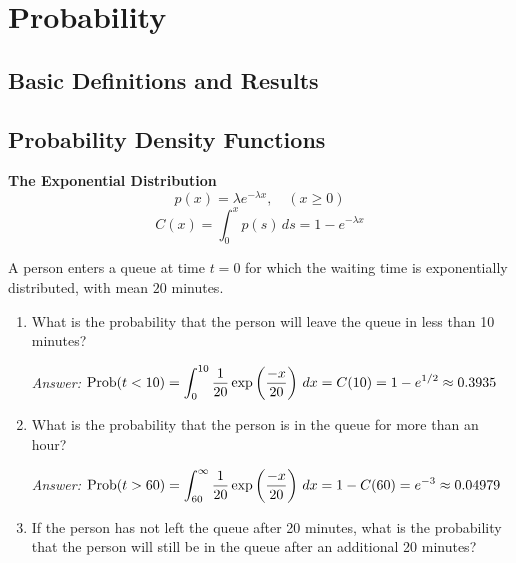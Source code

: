 %
\chapter{Probability}
%
\section{Basic Definitions and Results}
%
\section{Probability Density Functions}
%

\noindent
\textbf{The Exponential Distribution}
\begin{equation}
 p(x) = \lambda e^{-\lambda x}, \quad (x \ge 0)
\end{equation}
\begin{equation}
  C(x) = \int_0^x p(s)\,ds =  1 - e^{-\lambda x}
\end{equation}
\begin{xexample}
A person enters a queue at time $t=0$ for which the
waiting time is exponentially distributed, with mean $20$ minutes.
\begin{enumerate}
\item What is the probability that the person will leave the
queue in less than 10 minutes?

\noindent
\emph{Answer:} $\displaystyle \textrm{Prob}(t < 10) =\int_0^{10} \frac{1}{20} \exp\left(\frac{-x}{20}\right)\,dx
     = C(10) = 1-e^{1/2} \approx 0.3935$
\item What is the probability that the person is in the queue for
more than an hour?

\noindent
\emph{Answer:} $\displaystyle \textrm{Prob}(t > 60) = \int_{60}^{\infty} \frac{1}{20} \exp\left(\frac{-x}{20}\right)\,dx
     = 1-C(60) = e^{-3} \approx 0.04979$

\item If the person has not left the queue after 20 minutes, what is the
probability that the person will still be in the queue after an additional
20 minutes?
\end{enumerate}
\label{ex:exp_example}
\end{xexample}
%
